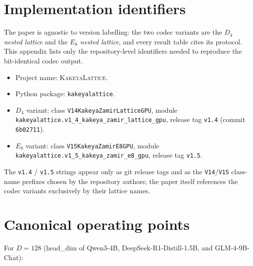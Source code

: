 \documentclass[10pt,a4paper]{article}
\theoremstyle{definition}
\theoremstyle{plain}
\begin{document}
\section{Implementation identifiers}
\label{app:naming}

The paper is agnostic to version labelling: the two codec variants
are the \emph{$D_4$ nested lattice} and the \emph{$E_8$ nested
lattice}, and every result table cites its protocol. This appendix
lists only the repository-level identifiers needed to reproduce the
bit-identical codec output.

\begin{itemize}[leftmargin=*]
  \item Project name: \textsc{KakeyaLattice}.
  \item Python package: \texttt{kakeyalattice}.
  \item $D_4$ variant: class
    \texttt{V14KakeyaZamirLatticeGPU}, module
    \texttt{kakeyalattice.v1\_4\_kakeya\_zamir\_lattice\_gpu},
    release tag \texttt{v1.4} (commit \texttt{6b02711}).
  \item $E_8$ variant: class
    \texttt{V15KakeyaZamirE8GPU}, module
    \texttt{kakeyalattice.v1\_5\_kakeya\_zamir\_e8\_gpu},
    release tag \texttt{v1.5}.
\end{itemize}

The \texttt{v1.4} / \texttt{v1.5} strings appear only as git release
tags and as the \texttt{V14}/\texttt{V15} class-name prefixes chosen
by the repository authors; the paper itself references the codec
variants exclusively by their lattice names.

\section{Canonical operating points}
\label{app:ops}

For $D = 128$ (head\_dim of Qwen3-4B, DeepSeek-R1-Distill-1.5B, and
GLM-4-9B-Chat):
\end{document}
